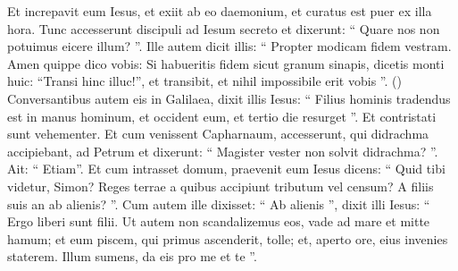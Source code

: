 \begin{biblechapter}
\begin{biblechapter}
\begin{biblechapter}
\begin{biblechapter}
\begin{biblechapter}
\begin{biblechapter}
\begin{biblechapter}
\begin{biblechapter}
\begin{biblechapter}
\begin{biblechapter}
\begin{biblechapter}
\begin{biblechapter}
\begin{biblechapter}
\begin{biblechapter}
\begin{biblechapter}
\begin{biblechapter}
\begin{biblechapter}
\verse Et increpavit eum Iesus, et exiit ab eo daemonium, et curatus est puer ex illa hora. 
\verse Tunc accesserunt discipuli ad Iesum secreto et dixerunt: “ Quare nos non potuimus eicere illum? ”. 
\verse Ille autem dicit illis: “ Propter modicam fidem vestram. Amen quippe dico vobis: Si habueritis fidem sicut
 granum sinapis, dicetis monti huic: “Transi hinc illuc!”, et transibit, et nihil impossibile erit vobis ”.
(\verse) \verse Conversantibus autem eis in Galilaea, dixit illis Iesus: “ Filius hominis tradendus est in manus hominum, 
\verse et occident eum, et tertio die resurget ”. Et contristati sunt vehementer.
 \verse Et cum venissent Capharnaum, accesserunt, qui didrachma accipiebant, ad Petrum et dixerunt: “ Magister vester non solvit didrachma? ”. 
\verse Ait: “ Etiam”. Et cum intrasset domum, praevenit eum Iesus dicens: “ Quid tibi videtur, Simon? Reges terrae a quibus accipiunt tributum vel censum? A filiis suis an ab alienis? ”. 
\verse Cum autem ille dixisset: “ Ab alienis ”, dixit illi Iesus: “ Ergo liberi sunt filii. 
\verse Ut autem non scandalizemus eos, vade ad mare et mitte hamum; et eum piscem, qui primus ascenderit, tolle; et, aperto ore, eius invenies staterem. Illum sumens, da eis pro me et te ”.
 

\end{biblechapter}
\end{biblechapter}
\end{biblechapter}
\end{biblechapter}
\end{biblechapter}
\end{biblechapter}
\end{biblechapter}
\end{biblechapter}
\end{biblechapter}
\end{biblechapter}
\end{biblechapter}
\end{biblechapter}
\end{biblechapter}
\end{biblechapter}
\end{biblechapter}
\end{biblechapter}
\end{biblechapter}
